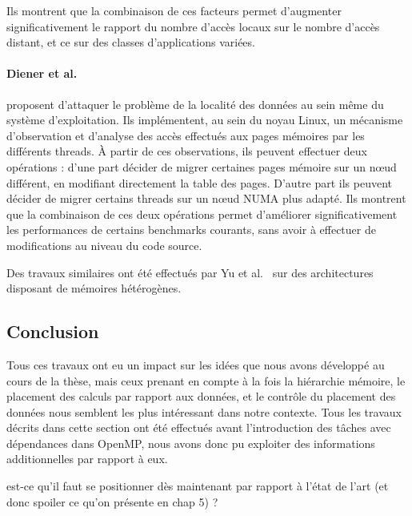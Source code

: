Ils montrent que la combinaison de ces facteurs permet d'augmenter significativement le rapport du nombre d'accès locaux sur le nombre d'accès distant, et ce sur des classes d'applications variées.




\paragraph{Diener et al.~\cite{Diener2014}} proposent d'attaquer le problème de la localité des données au sein même du système d'exploitation.
Ils implémentent, au sein du noyau Linux, un mécanisme d'observation et d'analyse des accès effectués aux pages mémoires par les différents threads.
À partir de ces observations, ils peuvent effectuer deux opérations : d'une part décider de migrer certaines pages mémoire sur un nœud différent, en modifiant directement la table des pages.
D'autre part ils peuvent décider de migrer certains threads sur un nœud NUMA plus adapté.
Ils montrent que la combinaison de ces deux opérations permet d'améliorer significativement les performances de certains benchmarks courants, sans avoir à effectuer de modifications au niveau du code source.

Des travaux similaires ont été effectués par Yu et al.~\cite{Yu2017} sur des architectures disposant de mémoires hétérogènes.



\subsection*{Conclusion}

Tous ces travaux ont eu un impact sur les idées que nous avons développé au cours de la thèse, mais ceux prenant en compte à la fois la hiérarchie mémoire, le placement des calculs par rapport aux données, et le contrôle du placement des données nous semblent les plus intéressant dans notre contexte.
Tous les travaux décrits dans cette section ont été effectués avant l'introduction des tâches avec dépendances dans OpenMP, nous avons donc pu exploiter des informations additionnelles par rapport à eux.

\begin{todo}
est-ce qu'il faut se positionner dès maintenant par rapport à l'état de l'art (et donc spoiler ce qu'on présente en chap 5) ?
\end{todo}

